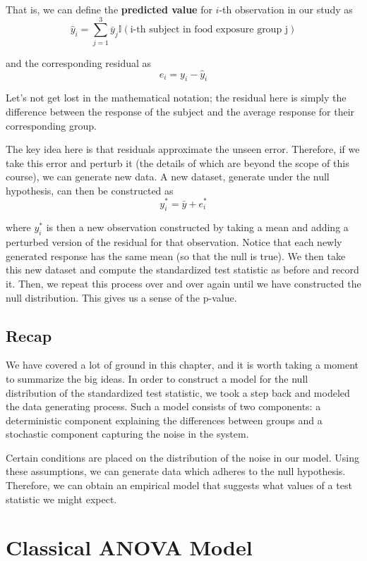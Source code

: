 \documentclass[]{book}
\theoremstyle{definition}
\theoremstyle{definition}
\theoremstyle{remark}
\begin{document}
That is, we can define the \textbf{predicted value} for \(i\)-th
observation in our study as \[
\widehat{y}_i = \sum_{j=1}^{3} \bar{y}_j \mathbb{I}(\text{i-th subject in food exposure group j})
\]

and the corresponding residual as \[
e_i = y_i - \widehat{y}_i
\]

Let's not get lost in the mathematical notation; the residual here is
simply the difference between the response of the subject and the
average response for their corresponding group.

The key idea here is that residuals approximate the unseen error.
Therefore, if we take this error and perturb it (the details of which
are beyond the scope of this course), we can generate new data. A new
dataset, generate under the null hypothesis, can then be constructed as
\[
y_i^* = \bar{y} + e_i^*
\]

where \(y_i^*\) is then a new observation constructed by taking a mean
and adding a perturbed version of the residual for that observation.
Notice that each newly generated response has the same mean (so that the
null is true). We then take this new dataset and compute the
standardized test statistic as before and record it. Then, we repeat
this process over and over again until we have constructed the null
distribution. This gives us a sense of the p-value.

\section{Recap}\label{recap}

We have covered a lot of ground in this chapter, and it is worth taking
a moment to summarize the big ideas. In order to construct a model for
the null distribution of the standardized test statistic, we took a step
back and modeled the data generating process. Such a model consists of
two components: a deterministic component explaining the differences
between groups and a stochastic component capturing the noise in the
system.

Certain conditions are placed on the distribution of the noise in our
model. Using these assumptions, we can generate data which adheres to
the null hypothesis. Therefore, we can obtain an empirical model that
suggests what values of a test statistic we might expect.

\chapter{Classical ANOVA Model}\label{ANOVAclassical}
\end{document}
